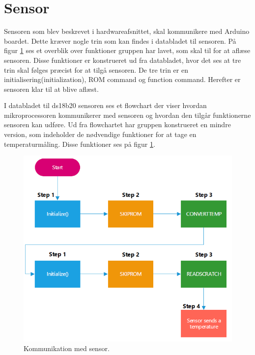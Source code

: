 \newpage
\section{Sensor}
Sensoren som blev beskrevet i hardwareafsnittet, skal kommunikere med Arduino boardet. Dette kræver nogle trin som kan findes i databladet til sensoren. På figur \ref{sensor_min} ses et overblik over funktioner gruppen har lavet, som skal til for at aflæse sensoren. Disse funktioner er konstrueret ud fra databladet, hvor det ses at tre trin skal følges præcist for at tilgå sensoren. De tre trin er en initialisering(initialization), ROM command og function command. Herefter er sensoren klar til at blive aflæst.



I databladet til ds18b20 sensoren ses et flowchart der viser hvordan mikroprocessoren kommunikerer med sensoren og hvordan den tilgår funktionerne  sensoren kan udføre. Ud fra flowchartet har gruppen konstrueret en mindre version, som indeholder de nødvendige funktioner for at tage en temperaturmåling. Disse funktioner ses på figur \ref{sensor_min}.



\begin{figure}[h!]
  \centering
  \includegraphics[width=1\textwidth]{figures/sensor_minimum.png}
  \caption{Kommunikation med sensor.}
  \label{sensor_min}
\end{figure}

